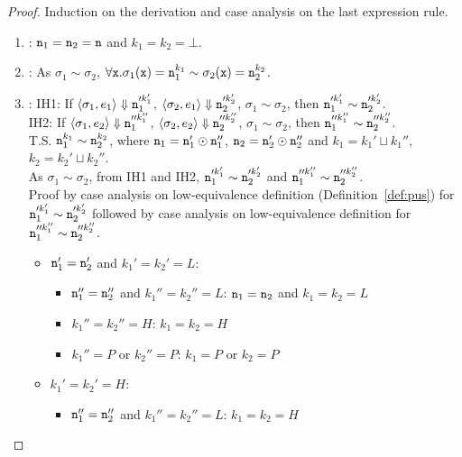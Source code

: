 \begin{proof}
Induction on the derivation and case analysis on the last
expression rule.
\begin{enumerate}
\item {}: $\texttt{n}_1 = \texttt{n}_2 = \texttt{n}$ and $k_1 = k_2 = \bot$. 

\item {}: As $\sigma_1 \sim \sigma_2$, $\forall \texttt{x}.\sigma_1(\texttt{x}) = \texttt{n}_1^{k_1}
  \sim \sigma_2(\texttt{x}) = \texttt{n}_2^{k_2}$. 

\item {}: IH1: If $\langle \sigma_1, e_1 \rangle \Downarrow
  \texttt{n}_1'^{k_1'}$, $\langle \sigma_2, e_1 \rangle \Downarrow
  \texttt{n}_2'^{k_2'}$, $\sigma_1 \sim \sigma_2$, then $\texttt{n}_1'^{k_1'}
  \sim \texttt{n}_2'^{k_2'}$.\\
IH2: If $\langle \sigma_1, e_2 \rangle \Downarrow
  \texttt{n}_1''^{k_1''}$, $\langle \sigma_2, e_2 \rangle \Downarrow
  \texttt{n}_2''^{k_2''}$, $\sigma_1 \sim \sigma_2$, then $\texttt{n}_1''^{k_1''}
  \sim \texttt{n}_2''^{k_2''}$.\\
T.S. $\texttt{n}_1^{k_1} \sim \texttt{n}_2^{k_2}$, where $\texttt{n}_1 = \texttt{n}_1' \odot \texttt{n}_1''$, $\texttt{n}_2 = \texttt{n}_2' \odot \texttt{n}_2''$ 
and $k_1 = k_1' \sqcup k_1''$, $k_2 = k_2' \sqcup k_2''$.\\
As $\sigma_1 \sim \sigma_2$, from IH1 and IH2, $\texttt{n}_1'^{k_1'}
  \sim \texttt{n}_2'^{k_2'}$ and $\texttt{n}_1''^{k_1''}  \sim \texttt{n}_2''^{k_2''}$.\\
Proof by case analysis on low-equivalence definition (Definition~\ref{def:pus}) for $\texttt{n}_1'^{k_1'} 
  \sim \texttt{n}_2'^{k_2'}$ followed by case analysis on low-equivalence definition for $\texttt{n}_1''^{k_1''}
  \sim \texttt{n}_2''^{k_2''}$.
\begin{itemize}
\item $\texttt{n}_1' = \texttt{n}_2'$ and $k_1' = k_2' = L$:
  \begin{itemize}
    \item $\texttt{n}_1'' = \texttt{n}_2''$ and $k_1'' = k_2'' = L$: $\texttt{n}_1 = \texttt{n}_2$ and
      $k_1 = k_2 = L$
    \item $k_1'' = k_2'' = H$: $k_1 = k_2 = H$
    \item $k_1'' = P$ or $k_2'' = P$: $k_1 = P$ or $k_2 = P$
  \end{itemize}
\item $k_1' = k_2' = H$:
  \begin{itemize}
    \item $\texttt{n}_1'' = \texttt{n}_2''$ and $k_1'' = k_2'' = L$: $k_1 = k_2 = H$

\end{itemize}
\end{itemize}
\end{enumerate}
\end{proof}
